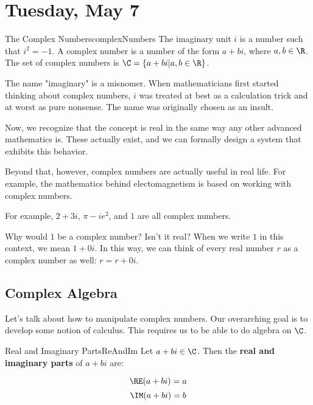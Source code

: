 \section{Tuesday, May 7}



\begin{defbo}{The Complex Numbers}{complexNumbers}
The imaginary unit $i$ is a number such that $i^2 = -1$. A complex number is a number of the form $a + bi$, where $a,b\in \R$. The set of complex numbers is $\C = \{a + bi| a,b\in \R\}$.
\end{defbo}

\begin{note}The name "imaginary" is a misnomer. When mathematicians first started thinking about complex numbers, $i$ was treated at best as a calculation trick and at worst as pure nonsense. The name was originally chosen as an insult.

Now, we recognize that the concept is real in the same way any other advanced mathematics is. These actually exist, and we can formally design a system that exhibits this behavior.

Beyond that, however, complex numbers are actually useful in real life. For example, the mathematics behind electomagnetism is based on working with complex numbers.\end{note}

\begin{ex}{}{} For example, $2 + 3i$, $\pi - ie^2$, and $1$ are all complex numbers.

Why would $1$ be a complex number? Isn't it real? When we write $1$ in this context, we mean $1 + 0i$. In this way, we can think of every real number $r$ as a complex number as well: $r = r + 0i$.
\end{ex}

\subsection{Complex Algebra}

Let's talk about how to manipulate complex numbers. Our overarching goal is to develop some notion of calculus. This requires us to be able to do algebra on $\C$.

\begin{defbo}{Real and Imaginary Parts}{ReAndIm} 
Let $a+ bi\in \C$. Then the {\bf real and imaginary parts} of $a+bi$ are:

$$\RE(a+bi) = a$$
$$\IM(a+bi) = b$$
\end{defbo}

